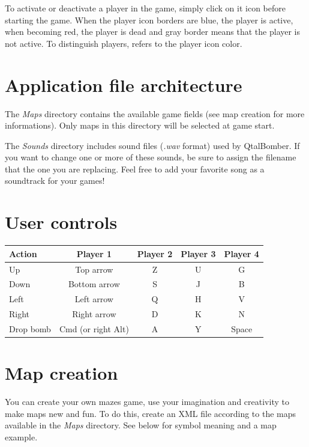 \documentclass{article}
\begin{document}
To activate or deactivate a player in the game, simply click on it icon
before starting the game. When the player icon borders are blue, the
player is active, when becoming red, the player is dead and gray border
means that the player is not active.
To distinguish players, refers to the player icon color.

\section{Application file architecture}

The \emph{Maps} directory contains the available game fields (see
map creation for more informations). Only maps in this directory will be
selected at game start.

The \emph{Sounds} directory includes sound files (\emph{.wav} format)
used by QtalBomber. If you want to change one or more of these sounds,
be sure to assign the filename that the one you are replacing.  Feel
free to add your favorite song as a soundtrack for your games!

\section{User controls}

\begin{center}
\begin{tabular}{l|c|c|c|c}
\toprule
Action      & Player 1           & Player 2 & Player 3 & Player 4 \\
\midrule
Up          & Top arrow          & Z        & U        & G        \\ 
Down        & Bottom arrow       & S        & J        & B        \\
Left        & Left arrow         & Q        & H        & V        \\
Right       & Right arrow        & D        & K        & N        \\
Drop bomb   & Cmd (or right Alt) & A        & Y        & Space    \\
\bottomrule
\end{tabular}
\end{center}



\section{Map creation}

You can create your own mazes game, use your imagination and creativity
to make maps new and fun. To do this, create an XML file according to
the maps available in the \emph{Maps} directory. See below for symbol
meaning and a map example.
\end{document}
